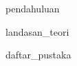 \documentclass[oneside, 12pt, a4paper]{book}
\numberwithin{equation}{chapter}
\numberwithin{algorithm}{chapter}
\begin{document}


\begin{doublespace}


\clearpage
{pendahuluan}


\clearpage
{landasan_teori}




\clearpage
{daftar_pustaka}



%
%
%
%
%
%


\end{doublespace}

\clearpage
\end{document}
